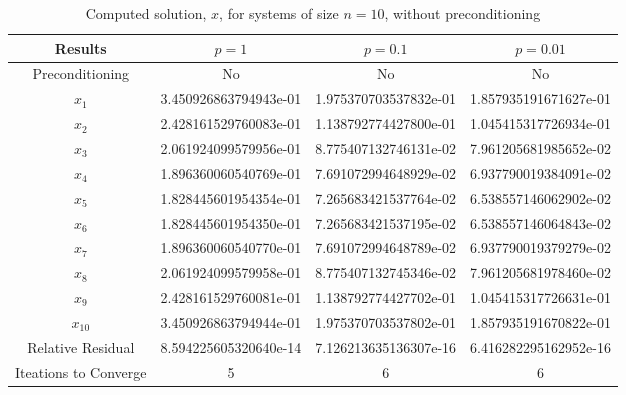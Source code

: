 \documentclass[12pt]{article}
\begin{document}
\begin{itemize}
\begin{table}[H]
\centering
\renewcommand{\arraystretch}{1.3}
\begin{small}
\begin{tabular}{| c || c | c | c |}
\hline
\textbf{Results} &  $p = 1$ & $p = 0.1$ & $p = 0.01$ \\
\hline 
\hline
Preconditioning & No & No & No \\
\hline
$x_1$ & 3.450926863794943e-01   & 1.975370703537832e-01  & 1.857935191671627e-01  \\
$x_2$ &  2.428161529760083e-01  & 1.138792774427800e-01  & 1.045415317726934e-01  \\
$x_3$ &  2.061924099579956e-01  & 8.775407132746131e-02  & 7.961205681985652e-02  \\
$x_4$ &  1.896360060540769e-01  & 7.691072994648929e-02  & 6.937790019384091e-02  \\
$x_5$ &  1.828445601954354e-01  & 7.265683421537764e-02  & 6.538557146062902e-02  \\
$x_6$ &  1.828445601954350e-01  & 7.265683421537195e-02  & 6.538557146064843e-02  \\
$x_7$ &  1.896360060540770e-01  & 7.691072994648789e-02  &  6.937790019379279e-02 \\
$x_8$ &  2.061924099579958e-01  & 8.775407132745346e-02  & 7.961205681978460e-02  \\
$x_9$ &  2.428161529760081e-01  & 1.138792774427702e-01  & 1.045415317726631e-01  \\
$x_{10}$ &  3.450926863794944e-01  & 1.975370703537802e-01  & 1.857935191670822e-01  \\
\hline
Relative Residual &  8.594225605320640e-14  & 7.126213635136307e-16  &   6.416282295162952e-16 \\
\hline
Iteations to Converge & 5  & 6  &  6 \\
\hline
\end{tabular}
\end{small}
\caption{Computed solution, $x$, for systems of size $n=10$, without preconditioning}
\end{table}


\end{itemize}
\end{document}
